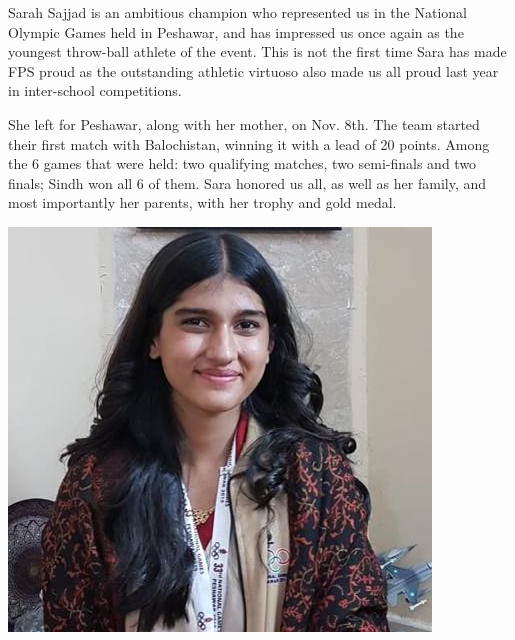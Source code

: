 \documentclass{article}
\begin{document}
\closearticle

\begin{multicols}{2}


Sarah Sajjad is an ambitious champion who represented us in the National Olympic Games held in Peshawar, and has impressed us once again as the youngest throw-ball athlete of the event. This is not the first time Sara has made FPS proud as the outstanding athletic virtuoso also made us all proud last year in inter-school competitions. 

She left for Peshawar, along with her mother, on Nov. 8th. The team started their first match with Balochistan, winning it with a lead of 20 points. Among the 6 games that were held: two qualifying matches, two semi-finals and two finals; Sindh won all 6 of them. Sara honored us all, as well as her family, and most importantly her parents, with her trophy and gold medal.  




\begin{center}
    \includegraphics[scale=0.4]{athlete}    
\end{center}






\end{multicols}
\end{document}
